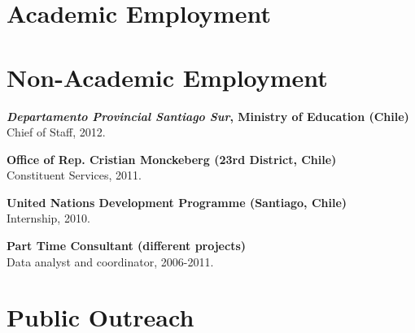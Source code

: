 \documentclass[letterpaper]{article}
\renewenvironment{itemize}{
  \begin{list}{}{
    \setlength{\leftmargin}{1.5em}
  }
}{
  \end{list}
}
\begin{document}
\section*{Academic Employment}

{\unskip}



\section*{Non-Academic Employment}

\begin{itemize}
  \item[] {\bf \emph{Departamento Provincial Santiago Sur}, Ministry of Education (Chile)}\\
    Chief of Staff, 2012.

  \item[] {\bf Office of Rep. Cristian Monckeberg (23rd District, Chile)}\\
    Constituent Services, 2011.

  \item[] {\bf United Nations Development Programme (Santiago, Chile)}\\
    Internship, 2010.

  \item[] {\bf Part Time Consultant (different projects)}\\
    Data analyst and coordinator, 2006-2011.
\end{itemize}



\section*{Public Outreach}
  {\unskip}
  {\unskip}



\end{document}

